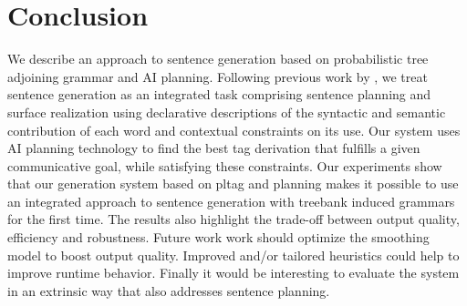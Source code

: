 \section{Conclusion}
\label{sec:conclusion}

We describe an approach to sentence generation based on probabilistic tree adjoining
grammar and AI planning. Following previous work by , we treat sentence 
generation as an integrated task comprising sentence planning and surface realization using declarative descriptions of the syntactic
and semantic contribution of each word and contextual constraints on its use. Our system uses AI planning technology to find the best {\sc tag} 
derivation that fulfills a given communicative goal, while satisfying these constraints. 
Our experiments show that our generation system based on {\sc pltag} and planning makes it possible to use an integrated approach to sentence generation with treebank induced grammars for the first time. The results also highlight the trade-off between output quality, efficiency and robustness. Future work work should optimize the smoothing model to boost output quality. Improved and/or tailored heuristics could help to improve runtime behavior. Finally it would be interesting to evaluate the system in an extrinsic way that also addresses sentence planning. 

